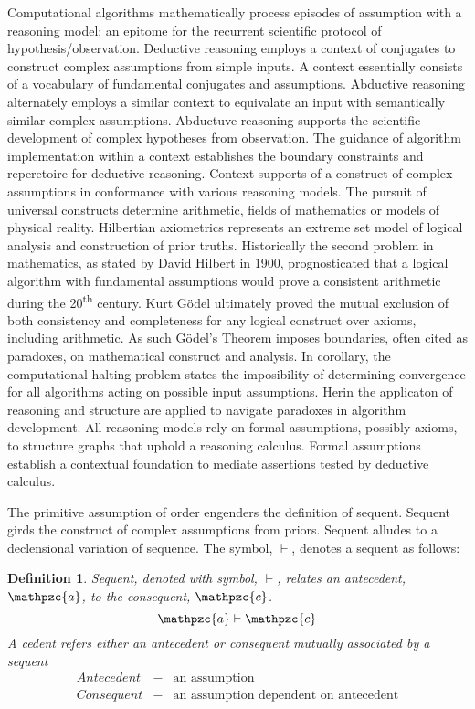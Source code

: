 \documentclass[aps,twocolumn,secnumarabic,nobalancelastpage,amsmath,amssymb,
amsthm,nofootinbib,parskip=full]{revtex4}
\numberwithin{equation}{section}
\newtheorem{definition}{Definition}[section]
\newcommand{\obk}[1]{\mathpzc{#1}}
\begin{document}
Computational algorithms mathematically process episodes of
assumption with a reasoning model; an epitome for the
recurrent scientific protocol of hypothesis/observation.
Deductive reasoning employs a context of conjugates
to construct complex assumptions from simple inputs.
A context essentially consists of a vocabulary of
fundamental conjugates and assumptions.
Abductive reasoning alternately employs a similar context to
equivalate an input with semantically similar complex assumptions.
Abductuve reasoning supports the scientific development of
complex hypotheses from observation.
The guidance of algorithm implementation within a context establishes the
boundary constraints and reperetoire for deductive reasoning.
Context supports of a construct of complex assumptions
in conformance with various reasoning models.
The pursuit of universal constructs determine
arithmetic, fields of mathematics or models of physical reality.
Hilbertian axiometrics represents an extreme set model of logical analysis
and construction of prior truths.
Historically the second problem in mathematics,
as stated by David Hilbert in 1900,
prognosticated that a logical algorithm with fundamental assumptions would
prove a consistent arithmetic during the 20\textsuperscript{th} century.
Kurt G\"{o}del ultimately proved the mutual exclusion of both
consistency and completeness for any logical construct over axioms,
including arithmetic.
As such G\"{o}del's Theorem imposes boundaries,
often cited as paradoxes, on mathematical construct and analysis.
In corollary, the computational halting problem states the imposibility of 
determining convergence for all algorithms acting on possible input assumptions.
Herin the applicaton of reasoning and structure are applied to navigate
paradoxes in algorithm development.
All reasoning models rely on formal assumptions, possibly axioms,
to structure graphs that uphold a reasoning calculus. 
Formal assumptions establish a contextual foundation to mediate assertions
tested by deductive calculus.

The primitive assumption of order engenders the definition of sequent.
Sequent girds the construct of complex assumptions from priors.
Sequent alludes to a declensional variation of sequence.
The symbol, $\vdash$, denotes a sequent as follows:

\begin{definition}{Sequent}\label{def:sequent},
  denoted with symbol, $\vdash$, relates an
  antecedent, $\obk{a}$, to the consequent, $\obk{c}$.
\begin{equation*}
\obk{a}\vdash\obk{c}
\end{equation*}
A cedent refers either an antecedent or consequent mutually
associated by a sequent
  \begin{equation*}
  \begin{array}{rll}
   Antecedent&-&\text{an assumption} \\[3pt]
   Consequent&-&\text{an assumption dependent on antecedent}
  \end{array}
  \end{equation*}
\end{definition}
\end{document}
